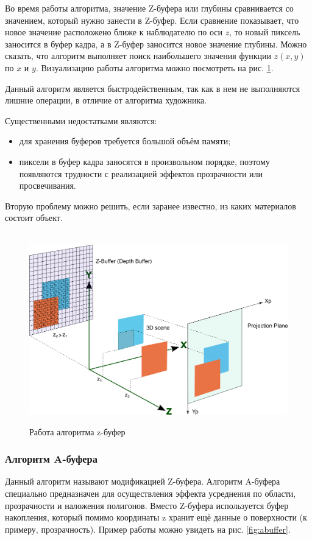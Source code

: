 \vspace{0.3cm}Во время работы алгоритма, значение Z-буфера или глубины сравнивается со значением, который нужно занести в Z-буфер. Если сравнение показывает, что новое значение расположено ближе к наблюдателю по оси $z$, то новый пиксель заносится в буфер кадра, а в Z-буфер заносится новое значение глубины. Можно сказать, что алгоритм выполняет поиск наибольшего значения функции $z(x,y)$ по $x$ и $y$. Визуализацию работы алгоритма можно посмотреть на рис. \ref{fig:zbuffer}.

\vspace{0.3cm}Данный алгоритм является быстродейственным, так как в нем не выполняются лишние операции, в отличие от алгоритма художника.

\vspace{0.3cm}Существенными недостатками являются:
\begin{itemize}
	\item для хранения буферов требуется большой объём памяти\cite{kurov};
	\item пиксели в буфер кадра заносятся в произвольном порядке, поэтому появляются трудности с реализацией эффектов прозрачности или просвечивания.
\end{itemize}

Вторую проблему можно решить, если заранее известно, из каких материалов состоит объект.

\begin{figure}[ht!]\
	\centering
	\includegraphics[scale=0.55]{zbuffer}
	\caption{Работа алгоритма z-буфер}
	\label{fig:zbuffer}
\end{figure}

\subsubsection{Алгоритм A-буфера}
\hspace{0.6cm}Данный алгоритм называют модификацией Z-буфера. Алгоритм A-буфера специально предназначен для осуществления эффекта усреднения по области, прозрачности и наложения полигонов. Вместо Z-буфера используется буфер накопления, который помимо координаты z хранит ещё данные о поверхности (к примеру, прозрачность). Пример работы можно увидеть на рис. \ref{fig:abuffer}.

